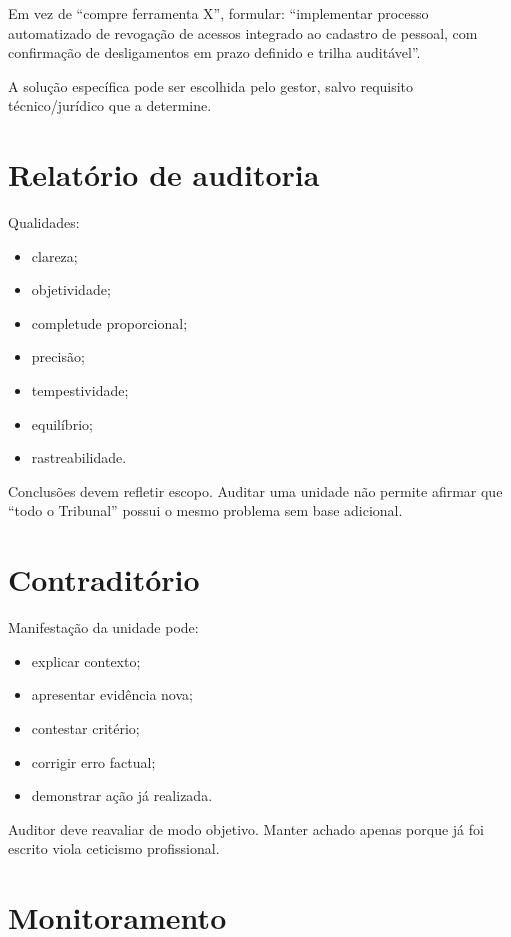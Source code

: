 \begin{example}
Em vez de ``compre ferramenta X'', formular: ``implementar processo automatizado de revogação de acessos integrado ao cadastro de pessoal, com confirmação de desligamentos em prazo definido e trilha auditável''.
\end{example}

A solução específica pode ser escolhida pelo gestor, salvo requisito técnico/jurídico que a determine.

\section{Relatório de auditoria}

Qualidades:
\begin{itemize}
\item clareza;
\item objetividade;
\item completude proporcional;
\item precisão;
\item tempestividade;
\item equilíbrio;
\item rastreabilidade.
\end{itemize}

Conclusões devem refletir escopo. Auditar uma unidade não permite afirmar que ``todo o Tribunal'' possui o mesmo problema sem base adicional.

\section{Contraditório}

Manifestação da unidade pode:
\begin{itemize}
\item explicar contexto;
\item apresentar evidência nova;
\item contestar critério;
\item corrigir erro factual;
\item demonstrar ação já realizada.
\end{itemize}

Auditor deve reavaliar de modo objetivo. Manter achado apenas porque já foi escrito viola ceticismo profissional.

\section{Monitoramento}

